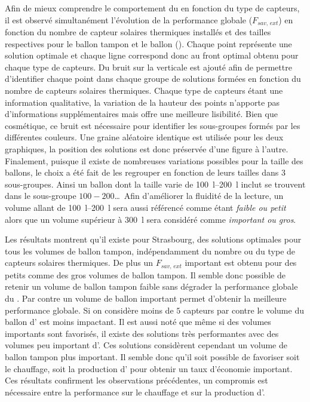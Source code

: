 Afin de mieux comprendre le comportement du  en fonction du type de capteurs, il
est observé simultanément l’évolution de la performance globale ($F_{sav,\, ext}$) en
fonction du nombre de capteur solaires thermiques installés et des tailles respectives
pour le ballon tampon et le ballon  ().
Chaque point représente une solution optimale et chaque ligne correspond donc au front
optimal obtenu pour chaque type de capteurs. Du bruit sur la verticale est ajouté afin de
permettre d’identifier chaque point dans chaque groupe de solutions formées en fonction du
nombre de capteurs solaires thermiques. Chaque type de capteurs étant une information
qualitative, la variation de la hauteur des points n’apporte pas d’informations
supplémentaires mais offre une meilleure lisibilité. Bien que cosmétique, ce bruit est
nécessaire pour identifier les sous-groupes formés par les différentes couleurs. Une
graine aléatoire identique est utilisée pour les deux graphiques, la position des solutions
est donc préservée d’une figure à l’autre.
Finalement, puisque il existe de nombreuses variations possibles pour la taille des ballons, le choix a été
fait de les regrouper en fonction de leurs tailles dans $3$ sous-groupes. Ainsi un ballon
dont la taille varie de \SIrange{100}{200}{\litre} inclut se trouvent dans le sous-groupe $100-200$\dots\
Afin d’améliorer la fluidité de la lecture, un volume allant de \SIrange{100}{200}{\litre} sera aussi référencé
comme étant \emph{faible ou petit} alors que un volume supérieur à \SI{300}{\litre} sera considéré comme \emph{important
ou gros}.

Les résultats montrent qu’il existe pour Strasbourg, des solutions optimales pour tous les volumes de
ballon tampon, indépendamment du nombre ou du type de capteurs solaires thermiques. De
plus un $F_{sav,\, ext}$ important est obtenu pour des petits comme des gros volumes de
ballon tampon. Il semble donc possible de retenir un volume de ballon tampon faible sans
dégrader la performance globale du \abr{SSC}. Par contre un volume de ballon 
important permet d’obtenir la meilleure performance globale. Si on considère moins de $5$
capteurs par contre le volume du ballon d’\abr{ECS} est moins impactant. Il est aussi noté
que même si des volumes importants sont favorisés, il existe des solutions très
performantes avec des volumes peu important d’\abr{ECS}. Ces solutions considèrent
cependant un volume de ballon tampon plus important. Il semble donc qu’il soit possible de
favoriser soit le chauffage, soit la production d’\abr{ECS} pour obtenir un taux
d’économie important. Ces résultats confirment les observations précédentes, un compromis
est nécessaire entre la performance sur le chauffage et sur la production d’\abr{ECS}.

